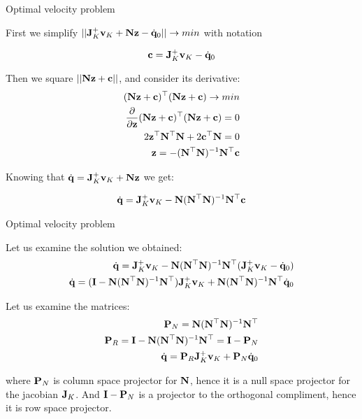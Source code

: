 \documentclass{beamer}
\begin{document}
\begin{frame}{Optimal velocity problem}
	\begin{flushleft}
		
		First we simplify $|| \mathbf{J}_K^+ \mathbf{v}_K + \mathbf{N} \mathbf{z} - \dot{\mathbf{q}}_0 || \rightarrow min$ with notation
		
		\begin{equation}
			\mathbf{c} = \mathbf{J}_K^+ \mathbf{v}_K -  \dot{\mathbf{q}}_0
		\end{equation}			
		
		Then we square $|| \mathbf{N} \mathbf{z} + \mathbf{c} ||$, and consider its derivative:
		\begin{align}
			(\mathbf{N} \mathbf{z} + \mathbf{c})^\top (\mathbf{N} \mathbf{z} + \mathbf{c}) \rightarrow min \\
			\frac{\partial }{\partial \mathbf{z}} (\mathbf{N} \mathbf{z} + \mathbf{c})^\top (\mathbf{N} \mathbf{z} + \mathbf{c}) = 0 \\
			2 \mathbf{z}^\top \mathbf{N}^\top \mathbf{N} + 2 \mathbf{c}^\top \mathbf{N} = 0 \\
			\mathbf{z} = -( \mathbf{N}^\top \mathbf{N})^{-1} \mathbf{N}^\top \mathbf{c}
		\end{align}	
	
		Knowing that $\dot{\mathbf{q}} = \mathbf{J}_K^+ \mathbf{v}_K + \mathbf{N} \mathbf{z}$ we get:
	
		\begin{align}
			\dot{\mathbf{q}} = \mathbf{J}_K^+ \mathbf{v}_K - \mathbf{N}  ( \mathbf{N}^\top \mathbf{N})^{-1} \mathbf{N}^\top \mathbf{c}
		\end{align}		
		
	\end{flushleft}
\end{frame}




\begin{frame}{Optimal velocity problem}
	\begin{flushleft}
		
		Let us examine  the solution we obtained:
		\begin{align}
			\dot{\mathbf{q}} =  \mathbf{J}_K^+ \mathbf{v}_K - \mathbf{N}  ( \mathbf{N}^\top \mathbf{N})^{-1} \mathbf{N}^\top (\mathbf{J}_K^+ \mathbf{v}_K -  \dot{\mathbf{q}}_0) 
			\\
			\dot{\mathbf{q}} = (\mathbf{I} - \mathbf{N}  ( \mathbf{N}^\top \mathbf{N})^{-1} \mathbf{N}^\top)\mathbf{J}_K^+ \mathbf{v}_K +  
			\mathbf{N}  ( \mathbf{N}^\top \mathbf{N})^{-1} \mathbf{N}^\top\dot{\mathbf{q}}_0
		\end{align}				
	
		Let us examine the matrices:
		\begin{align}
			\mathbf{P}_N = \mathbf{N}  ( \mathbf{N}^\top \mathbf{N})^{-1} \mathbf{N}^\top
		\\
			\mathbf{P}_R = \mathbf{I} - \mathbf{N}  ( \mathbf{N}^\top \mathbf{N})^{-1} \mathbf{N}^\top =  \mathbf{I} - \mathbf{P}_N \\
			\dot{\mathbf{q}} =\mathbf{P}_R \mathbf{J}_K^+ \mathbf{v}_K +  
			\mathbf{P}_N \dot{\mathbf{q}}_0
		\end{align}	

		where $\mathbf{P}_N$ is column space projector for $\mathbf{N}$, hence it is a null space projector for the jacobian $\mathbf{J}_K$. And $ \mathbf{I} - \mathbf{P}_N$ is a projector to the orthogonal compliment, hence it is row space projector.
		
	\end{flushleft}
\end{frame}
\end{document}
